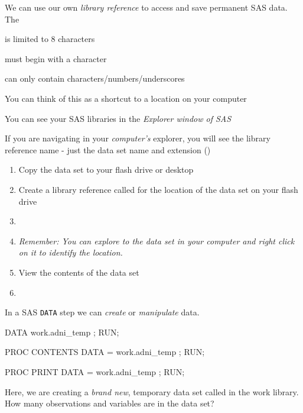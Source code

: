\begin{frame}

\bi
\item We can use our own \emph{library reference} to access and save permanent SAS data.  The 
\bi
    \item is limited to 8 characters
    \item must begin with a character
    \item can only contain characters/numbers/underscores
\ei
\item You can think of this as a shortcut to a location on your computer
\item You can see your SAS libraries in the \emph{Explorer window of SAS}
\item If you are navigating in your \emph{computer's} explorer, you will  see the library reference name - just the data set name and extension ()
\ei
\end{frame}

\begin{frame}
\oyo
\begin{enumerate}
    \item Copy the data set  to your flash drive or desktop
    \item Create a library reference called  for the location of the data set on your flash drive
    \item[] 
    \item[] \emph{Remember: You can explore to the data set in your computer and right click on it to identify the location.}
    \item View the contents of the data set
    \item[] 
\end{enumerate}
\end{frame}

\begin{frame}[fragile]
In a SAS \texttt{DATA} step we can \emph{create} or \emph{manipulate} data.
\vskip10pt
\footnotesize
\begin{code}{.0}
DATA work.adni_temp ;
RUN;

PROC CONTENTS DATA = work.adni_temp ;
RUN;

PROC PRINT DATA = work.adni_temp ;
RUN;
\end{code}
\emp
\vskip10pt
Here, we are creating a \emph{brand new}, temporary data set called  in the work library.\\
\vskip10pt
\oyo How many observations and variables are in the  data set?
\end{frame}

